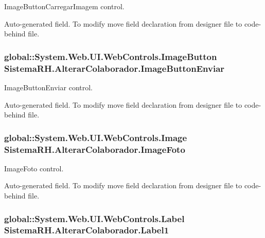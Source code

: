 ImageButtonCarregarImagem control. 

Auto-\/generated field. To modify move field declaration from designer file to code-\/behind file. \hypertarget{class_sistema_r_h_1_1_alterar_colaborador_a36f7c38f1a0cacc240f62654146feb7f}{
\subsubsection[{ImageButtonEnviar}]{\setlength{\rightskip}{0pt plus 5cm}global::System.Web.UI.WebControls.ImageButton {\bf SistemaRH.AlterarColaborador.ImageButtonEnviar}}}
\label{class_sistema_r_h_1_1_alterar_colaborador_a36f7c38f1a0cacc240f62654146feb7f}


ImageButtonEnviar control. 

Auto-\/generated field. To modify move field declaration from designer file to code-\/behind file. \hypertarget{class_sistema_r_h_1_1_alterar_colaborador_ac08e2cf434bd8b4bc8d80b16d36b43a0}{
\subsubsection[{ImageFoto}]{\setlength{\rightskip}{0pt plus 5cm}global::System.Web.UI.WebControls.Image {\bf SistemaRH.AlterarColaborador.ImageFoto}}}
\label{class_sistema_r_h_1_1_alterar_colaborador_ac08e2cf434bd8b4bc8d80b16d36b43a0}


ImageFoto control. 

Auto-\/generated field. To modify move field declaration from designer file to code-\/behind file. \hypertarget{class_sistema_r_h_1_1_alterar_colaborador_ad24f8cf99449399d0fbbdf7d763ad9ec}{
\subsubsection[{Label1}]{\setlength{\rightskip}{0pt plus 5cm}global::System.Web.UI.WebControls.Label {\bf SistemaRH.AlterarColaborador.Label1}}}
\label{class_sistema_r_h_1_1_alterar_colaborador_ad24f8cf99449399d0fbbdf7d763ad9ec}


